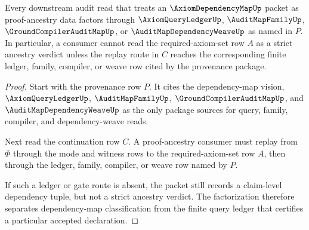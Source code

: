 \begin{theorem}
\label{thm:axiom-dependency-map-query-ledger-factorization}
Every downstream audit read that treats an $\AxiomDependencyMapUp$ packet as proof-ancestry data factors through $\AxiomQueryLedgerUp$, $\AuditMapFamilyUp$, $\GroundCompilerAuditMapUp$, or $\AuditMapDependencyWeaveUp$ as named in $P$. In particular, a consumer cannot read the required-axiom-set row $A$ as a strict ancestry verdict unless the replay route in $C$ reaches the corresponding finite ledger, family, compiler, or weave row cited by the provenance package.
\end{theorem}
\begin{proof}
Start with the provenance row $P$. It cites the dependency-map vision, $\AxiomQueryLedgerUp$, $\AuditMapFamilyUp$, $\GroundCompilerAuditMapUp$, and $\AuditMapDependencyWeaveUp$ as the only package sources for query, family, compiler, and dependency-weave reads.

Next read the continuation row $C$. A proof-ancestry consumer must replay from $\Phi$ through the mode and witness rows to the required-axiom-set row $A$, then through the ledger, family, compiler, or weave row named by $P$.

If such a ledger or gate route is absent, the packet still records a claim-level dependency tuple, but not a strict ancestry verdict. The factorization therefore separates dependency-map classification from the finite query ledger that certifies a particular accepted declaration.
\end{proof}

